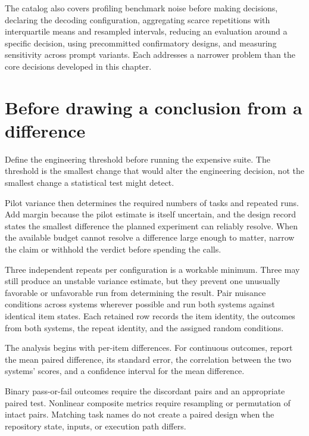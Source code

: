 The catalog also covers profiling benchmark noise before making decisions, declaring the decoding configuration, aggregating scarce repetitions with interquartile means and resampled intervals, reducing an evaluation around a specific decision, using precommitted confirmatory designs, and measuring sensitivity across prompt variants. Each addresses a narrower problem than the core decisions developed in this chapter.

\hypertarget{before-drawing-a-conclusion-from-a-difference}{%
\section{Before drawing a conclusion from a difference}\label{before-drawing-a-conclusion-from-a-difference}}

Define the engineering threshold before running the expensive suite. The threshold is the smallest change that would alter the engineering decision, not the smallest change a statistical test might detect.

Pilot variance then determines the required numbers of tasks and repeated runs. Add margin because the pilot estimate is itself uncertain, and the design record states the smallest difference the planned experiment can reliably resolve. When the available budget cannot resolve a difference large enough to matter, narrow the claim or withhold the verdict before spending the calls.

Three independent repeats per configuration is a workable minimum. Three may still produce an unstable variance estimate, but they prevent one unusually favorable or unfavorable run from determining the result. Pair nuisance conditions across systems wherever possible and run both systems against identical item states. Each retained row records the item identity, the outcomes from both systems, the repeat identity, and the assigned random conditions.

The analysis begins with per-item differences. For continuous outcomes, report the mean paired difference, its standard error, the correlation between the two systems' scores, and a confidence interval for the mean difference.

Binary pass-or-fail outcomes require the discordant pairs and an appropriate paired test. Nonlinear composite metrics require resampling or permutation of intact pairs. Matching task names do not create a paired design when the repository state, inputs, or execution path differs.


